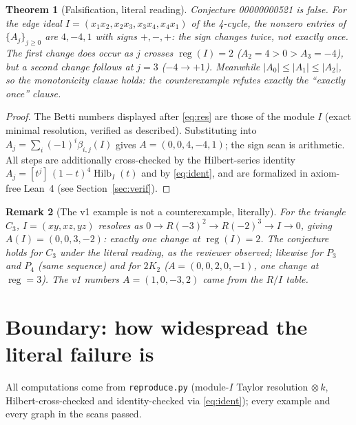 \documentclass[11pt]{article}
\newtheorem{theorem}{Theorem}
\newtheorem{remark}[theorem]{Remark}
\begin{document}
\begin{theorem}[Falsification, literal reading]
\label{thm:main}
Conjecture 00000000521 is false.  For the edge ideal
$I=(x_1x_2,x_2x_3,x_3x_4,x_4x_1)$ of the 4-cycle, the nonzero entries of
$\{A_j\}_{j\ge0}$ are $4,-4,1$ with signs $+,-,+$: the sign changes
\emph{twice}, not exactly once.  The first change does occur as $j$ crosses
$\operatorname{reg}(I)=2$ ($A_2=4>0>A_3=-4$), but a second change follows
at $j=3$ ($-4\to+1$).  Meanwhile $|A_0|\le|A_1|\le|A_2|$, so the
monotonicity clause holds: the counterexample refutes exactly the
``exactly once'' clause.
\end{theorem}

\begin{proof}
The Betti numbers displayed after \eqref{eq:res} are those of the module
$I$ (exact minimal resolution, verified as described).  Substituting into
$A_j=\sum_i(-1)^i\beta_{i,j}(I)$ gives $A=(0,0,4,-4,1)$; the sign scan is
arithmetic.  All steps are additionally cross-checked by the Hilbert-series
identity $A_j=[t^j]\,(1-t)^4\operatorname{Hilb}_I(t)$ and by
\eqref{eq:ident}, and are formalized in axiom-free Lean~4 (see
Section~\ref{sec:verif}).
\end{proof}

\begin{remark}[The v1 example is not a counterexample, literally]
For the triangle $C_3$, $I=(xy,xz,yz)$ resolves as
$0\to R(-3)^2\to R(-2)^3\to I\to 0$, giving
$A(I)=(0,0,3,-2)$: exactly one change at $\operatorname{reg}(I)=2$.  The
conjecture \emph{holds} for $C_3$ under the literal reading, as the
reviewer observed; likewise for $P_3$ and $P_4$ (same sequence) and for
$2K_2$ ($A=(0,0,2,0,-1)$, one change at $\operatorname{reg}=3$).  The v1
numbers $A=(1,0,-3,2)$ came from the $R/I$ table.
\end{remark}

\section{Boundary: how widespread the literal failure is}

All computations come from \texttt{reproduce.py} (module-$I$ Taylor
resolution $\otimes\,k$, Hilbert-cross-checked and identity-checked via
\eqref{eq:ident}); every example and every graph in the scans passed.
\end{document}

